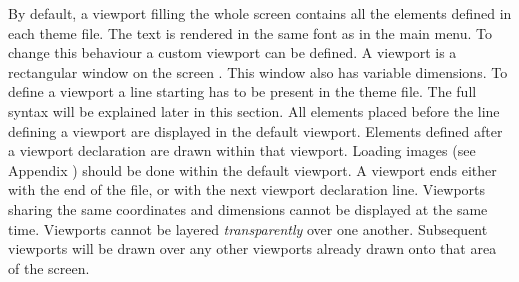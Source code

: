 By default, a viewport filling the whole screen contains all the elements
defined in each theme file. The
text is rendered in the
same font as in the main menu. To change this behaviour a custom viewport can
be defined. A viewport is a rectangular window on the screen%
.
This window also has variable dimensions. To
define a viewport a line starting  has to be
present in the theme file. The full syntax will be explained later in
this section. All elements placed before the
line defining a viewport are displayed in the default viewport. Elements
defined after a viewport declaration are drawn within that viewport.
Loading images (see Appendix )
should be done within the default viewport.
A viewport ends either with the end of the file, or with the next viewport
declaration line. Viewports sharing the same
coordinates and dimensions cannot be displayed at the same time. Viewports
cannot be layered \emph{transparently} over one another. Subsequent viewports
will be drawn over any other viewports already drawn onto that
area of the screen.



